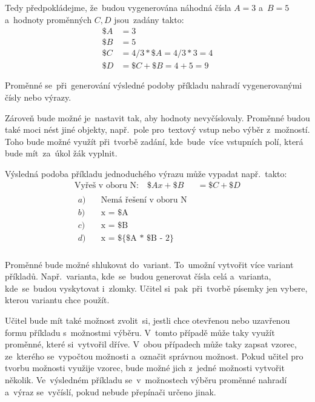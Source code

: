 \documentclass[14pt,a4paper]{article}
\begin{document}
        Tedy předpokládejme, že~budou vygenerována náhodná čísla $A = 3$ a~$B = 5$
        a~hodnoty proměnných $C, D$ jsou~zadány takto:
        \begin{align*}
            \$A &= 3 \\
            \$B &= 5 \\
            \$C &= 4/3*\$A = 4/3*3 = 4 \\
            \$D &= \$C + \$B = 4 + 5 = 9
        \end{align*}

        Proměnné se~při~generování výsledné podoby příkladu nahradí vygenerovanými čísly nebo výrazy.
        
        Zároveň bude možné je~nastavit tak, aby hodnoty nevyčíslovaly. Proměnné budou také moci nést jiné objekty, např.~pole pro~textový vstup nebo výběr z~možností. Toho bude možné využít při~tvorbě zadání, kde~bude~více vstupních polí, která bude mít~za~úkol žák vyplnit.

        Výsledná podoba příkladu jednoduchého výrazu může vypadat např.~takto:
        \begin{align*}
            \text{Vyřeš v oboru N:} \quad \$Ax + \$B &= \$C + \$D \\
            \begin{aligned}
                a) \quad &\text{Nemá řešení v oboru N} \\
                b) \quad &\text{x = \$A} \\
                c) \quad &\text{x = \$B} \\
                d) \quad &\text{x = \$\{\$A * \$B - 2\}} \\
            \end{aligned}
        \end{align*}

        Proměnné bude možné shlukovat do~variant. To~umožní vytvořit více variant příkladů. Např.~varianta, kde~se~budou generovat čísla celá a~varianta, kde~se~budou vyskytovat i~zlomky. Učitel si~pak~při~tvorbě písemky jen vybere, kterou variantu chce použít.

        Učitel bude mít také možnost zvolit~si, jestli chce otevřenou nebo uzavřenou formu příkladu s~možnostmi výběru. V~tomto případě může taky využít proměnné, které si~vytvořil dříve. V~obou případech může taky zapsat vzorec, ze~kterého se~vypočtou možnosti a~označit správnou možnost. Pokud učitel pro tvorbu možnosti využije vzorec, bude možné jich z~jedné možnosti vytvořit několik. Ve~výsledném příkladu se~v~možnostech výběru proměnné nahradí a~výraz se~vyčíslí, pokud nebude přepínači určeno jinak.
\end{document}
